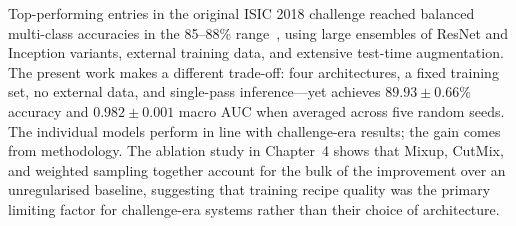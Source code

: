 \documentclass[11pt,a4paper]{report}
\begin{document}
Top-performing entries in the original ISIC 2018 challenge reached balanced multi-class accuracies in the 85--88\% range~\cite{codella2019skin}, using large ensembles of ResNet and Inception variants, external training data, and extensive test-time augmentation. The present work makes a different trade-off: four architectures, a fixed training set, no external data, and single-pass inference---yet achieves $89.93 \pm 0.66\%$ accuracy and $0.982 \pm 0.001$ macro AUC when averaged across five random seeds. The individual models perform in line with challenge-era results; the gain comes from methodology. The ablation study in Chapter~4 shows that Mixup, CutMix, and weighted sampling together account for the bulk of the improvement over an unregularised baseline, suggesting that training recipe quality was the primary limiting factor for challenge-era systems rather than their choice of architecture.






\printbibliography[title={References}]
\end{document}
